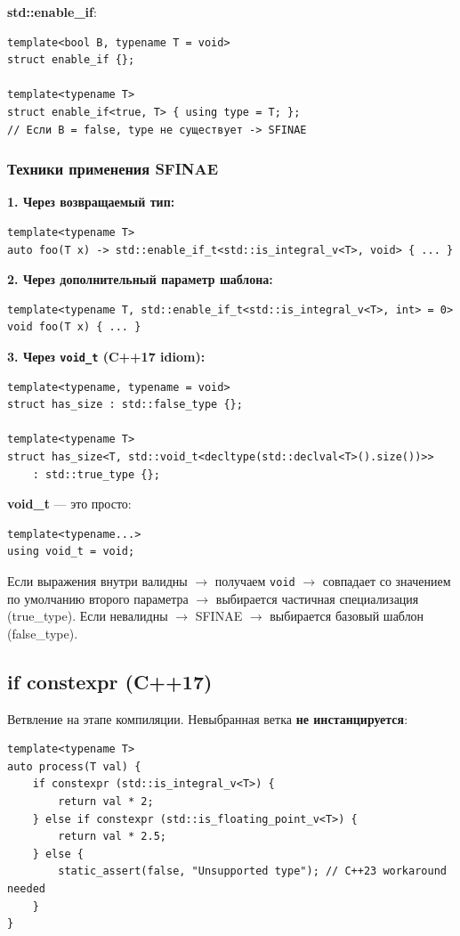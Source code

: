 \documentclass[12pt,a4paper]{article}
\begin{document}
\textbf{std::enable\_if}:
\begin{lstlisting}
template<bool B, typename T = void>
struct enable_if {};

template<typename T>
struct enable_if<true, T> { using type = T; };
// Если B = false, type не существует -> SFINAE
\end{lstlisting}

\subsubsection{Техники применения SFINAE}

\textbf{1. Через возвращаемый тип:}
\begin{lstlisting}
template<typename T>
auto foo(T x) -> std::enable_if_t<std::is_integral_v<T>, void> { ... }
\end{lstlisting}

\textbf{2. Через дополнительный параметр шаблона:}
\begin{lstlisting}
template<typename T, std::enable_if_t<std::is_integral_v<T>, int> = 0>
void foo(T x) { ... }
\end{lstlisting}

\textbf{3. Через \texttt{void\_t} (C++17 idiom):}
\begin{lstlisting}
template<typename, typename = void>
struct has_size : std::false_type {};

template<typename T>
struct has_size<T, std::void_t<decltype(std::declval<T>().size())>>
    : std::true_type {};
\end{lstlisting}

\textbf{void\_t} --- это просто:
\begin{lstlisting}
template<typename...>
using void_t = void;
\end{lstlisting}
Если выражения внутри валидны $\to$ получаем \texttt{void} $\to$ совпадает со значением по умолчанию второго параметра $\to$ выбирается частичная специализация (true\_type). Если невалидны $\to$ SFINAE $\to$ выбирается базовый шаблон (false\_type).

\subsection{if constexpr (C++17)}

Ветвление на этапе компиляции. Невыбранная ветка \textbf{не инстанцируется}:
\begin{lstlisting}
template<typename T>
auto process(T val) {
    if constexpr (std::is_integral_v<T>) {
        return val * 2;
    } else if constexpr (std::is_floating_point_v<T>) {
        return val * 2.5;
    } else {
        static_assert(false, "Unsupported type"); // C++23 workaround needed
    }
}
\end{lstlisting}
\end{document}
